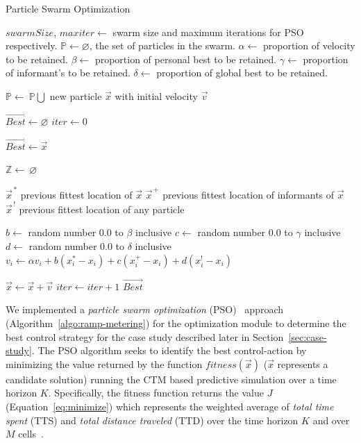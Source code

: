 \documentclass[12pt]{article}
\begin{document}
\begin{algorithm}[!htbp]
\caption{Particle Swarm Optimization}
\label{algo:ramp-metering}

\begin{algorithmic}[1]
\State $swarmSize$, $maxiter\leftarrow$ swarm size and maximum iterations for PSO respectively.
\State $\mathbb{P}\leftarrow \varnothing$, the set of particles in the swarm.
\State $\alpha \leftarrow$ proportion of velocity to be retained.
\State $\beta \leftarrow$ proportion of personal best to be retained.
\State $\gamma \leftarrow$ proportion of informant's to be retained.
\State $\delta \leftarrow$ proportion of global best to be retained.


	\State $\mathbb{P} \leftarrow~\mathbb{P}\bigcup$ {new particle $\vec{x}$ with initial velocity $\vec{v}$}
\EndFor	

\State $\vec{Best}\leftarrow\varnothing$
\State $iter\leftarrow0$

\Repeat

\State $\vec{Best}\leftarrow \vec{x}$
\EndIf
\EndFor

\State$\mathbb{Z}\leftarrow~\varnothing$

\State $\vec{x}^{\,*}$ previous fittest location of $\vec{x}$
\State $\vec{x}^{\,+}$ previous fittest location of informants of $\vec{x}$
\State $\vec{x}^{\,!}$ previous fittest location of any particle

\State $b\leftarrow$ random number $0.0$ to $\beta$ inclusive
\State $c\leftarrow$ random number $0.0$ to $\gamma$ inclusive
\State $d\leftarrow$ random number $0.0$ to $\delta$ inclusive
\State $v_i\leftarrow \alpha v_i+b(x_{i}^{*} - x_i)+c(x_{i}^{+} - x_i)+d(x_{i}^{!} - x_i)$
\EndFor

\EndFor

\State $\vec{x}\leftarrow \vec{x}+\vec{v}$
\EndFor
\State $iter\leftarrow iter+1$
\State \Return $\vec{Best}$
\end{algorithmic}
\end{algorithm}

We implemented a {\it particle swarm optimization} (PSO)~\cite{weise2009global} approach (Algorithm~\ref{algo:ramp-metering}) for the optimization module to determine the best control strategy for the case study described later in Section~\ref{sec:case-study}.
The PSO algorithm seeks to identify the best control-action by minimizing the value returned by the function $fitness(\vec{x})$ ($\vec{x}$ represents a candidate solution) running the CTM based predictive simulation over a time horizon $K$. Specifically, the fitness function returns the value $J$ (Equation~\ref{eq:minimize}) which represents the weighted average of {\it total time spent} (TTS) and {\it total distance traveled} (TTD) over the time horizon $K$ and over $M$ cells~\cite{hadiuzzaman2013cell}.
\end{document}

